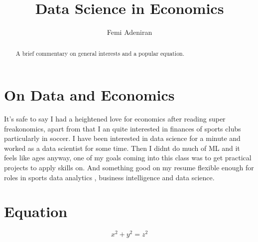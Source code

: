 \documentclass{article}
\title{Data Science in Economics}
\author{Femi Adeniran}
\begin{document}
\maketitle

\begin{abstract}
A brief commentary on general interests and a popular equation.
\end{abstract}

\section{On Data and Economics}

It's safe to say I had a heightened love for economics after reading super freakonomics, apart from that I an quite interested in finances of sports clubs particularly in soccer. 
I have been interested in data science for a minute and worked as a data scientist for some time. Then I didnt do much of ML and it feels like ages anyway, one of my goals coming into this class was to get practical projects to apply skills on. And something good on my resume flexible enough for roles in sports data analytics , business intelligence and data science.

\section{Equation}
\[x^2+ y^2 = z^2 \]
\end{document}

